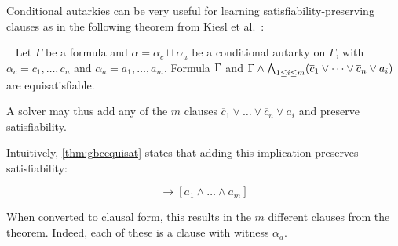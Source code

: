 
Conditional autarkies can be very useful for learning satisfiability-preserving
clauses as in the
following theorem from Kiesl et al.~\cite{conditionalautarkies}:

\begin{theorem}~\label{thm:gbcequisat} Let $\Gamma$ be a formula and $\alpha =
    \alpha_c \sqcup \alpha_a$ be a conditional autarky on $\Gamma$, with
    $\alpha_c = c_1, \dots, c_n$ and $\alpha_a = a_1, \dots, a_m$. Formula
    $\Gamma$ and $\Gamma \land \bigwedge_{1 \leq i \leq m} (\overline{c}_1
    \lor \dots \lor \overline{c}_n \lor a_i)$ are equisatisfiable.
\end{theorem}


A solver may thus add any of the $m$ clauses
$\overline{c}_1 \lor \dots \lor \overline{c}_n \lor a_i$ and preserve
satisfiability. 

Intuitively, \autoref{thm:gbcequisat} states that adding this implication
preserves satisfiability:

\begin{equation*}
    [c_1 \land \dots \land c_n] \rightarrow [a_1 \land \dots \land a_m]
\end{equation*}

When converted to clausal form, this results in the $m$ different clauses from
the theorem. Indeed, each of these is a \pr clause with witness $\alpha_a$.



